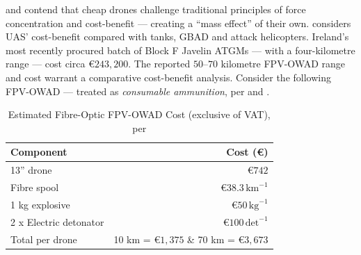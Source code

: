 \textcite{DAVIS_e_2025} and \textcite[8]{kunertova_2024_2024_08} contend that cheap drones challenge traditional principles of force concentration and cost-benefit --- creating a ``mass effect'' of their own. \textcite{Neuberger_FP_2026} considers UAS' cost-benefit compared with tanks, GBAD and attack helicopters. Ireland's most recently procured batch of Block F Javelin ATGMs --- with a four-kilometre range --- cost circa \euro$243{,}200$. The reported $50$--$70$ kilometre FPV-OWAD range and cost warrant a comparative cost-benefit analysis. Consider the following FPV-OWAD --- treated as \emph{consumable ammunition}, per \textcite{BRONK_2024,DEVERAUX_2022,GRIFFITHS_2025} and \textcite[58]{ZABRODSKYI_2022}.


\begin{table}[H]
	\centering
	\begin{tabular}{l r}
		\toprule
		\textbf{Component} & \textbf{Cost (€)} \\
		\midrule
		13'' drone & $€742$ \\
		Fibre spool & $€38.3\,\text{km}^{-1}$ \\
		1 kg explosive & $€50\,\text{kg}^{-1}$ \\
		2 x Electric detonator & $€100\,\text{det}^{-1}$ \\
		\midrule
		Total per drone & 10 km = \textbf{$€1{,}375$} \& 70 km = \textbf{$€3{,}673$}  \\
		\bottomrule
	\end{tabular}
	\caption[Estimated tethered FPV-OWAD cost]{Estimated Fibre-Optic FPV-OWAD Cost (exclusive of VAT), per \textcite{FPV_cost_spool,FPV_cost1,FPV_cost}} \label{javcost}
\end{table}

